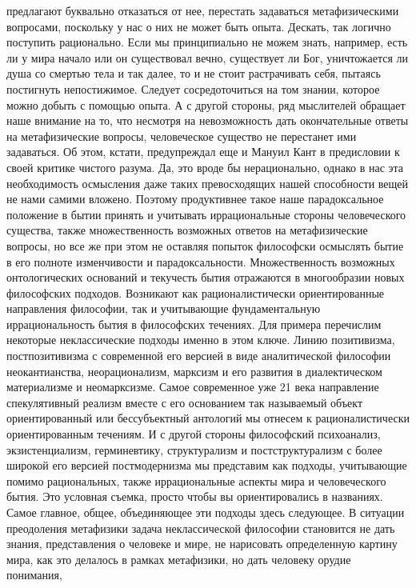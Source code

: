 предлагают буквально отказаться от нее, перестать задаваться метафизическими
вопросами, поскольку у нас о них не может быть опыта. Дескать, так логично
поступить рационально. Если мы принципиально не можем знать, например, есть ли у
мира начало или он существовал вечно, существует ли Бог, уничтожается ли душа со
смертью тела и так далее, то и не стоит растрачивать себя, пытаясь постигнуть
непостижимое. Следует сосредоточиться на том знании, которое можно добыть с
помощью опыта. А с другой стороны, ряд мыслителей обращает наше внимание на то,
что несмотря на невозможность дать окончательные ответы на метафизические
вопросы, человеческое существо не перестанет ими задаваться. Об этом, кстати,
предупреждал еще и Мануил Кант в предисловии к своей критике чистого разума. Да,
это вроде бы нерационально, однако в нас эта необходимость осмысления даже таких
превосходящих нашей способности вещей не нами самими вложено. Поэтому
продуктивнее такое наше парадоксальное положение в бытии принять и учитывать
иррациональные стороны человеческого существа, также множественность возможных
ответов на метафизические вопросы, но все же при этом не оставляя попыток
философски осмыслять бытие в его полноте изменчивости и парадоксальности.
Множественность возможных онтологических оснований и текучесть бытия отражаются
в многообразии новых философских подходов. Возникают как рационалистически
ориентированные направления философии, так и учитывающие фундаментальную
иррациональность бытия в философских течениях. Для примера перечислим некоторые
неклассические подходы именно в этом ключе. Линию позитивизма, постпозитивизма с
современной его версией в виде аналитической философии неокантианства,
неорационализм, марксизм и его развития в диалектическом материализме и
неомарксизме. Самое современное уже 21 века направление спекулятивный реализм
вместе с его основанием так называемый объект ориентированный или бессубъектный
антологий мы отнесем к рационалистически ориентированным течениям. И с другой
стороны философский психоанализ, экзистенциализм, герминевтику, структурализм и
постструктурализм с более широкой его версией постмодернизма мы представим как
подходы, учитывающие помимо рациональных, также иррациональные аспекты мира и
человеческого бытия. Это условная съемка, просто чтобы вы ориентировались в
названиях. Самое главное, общее, объединяющее эти подходы здесь следующее. В
ситуации преодоления метафизики задача неклассической философии становится не
дать знания, представления о человеке и мире, не нарисовать определенную картину
мира, как это делалось в рамках метафизики, но дать человеку орудие понимания,
